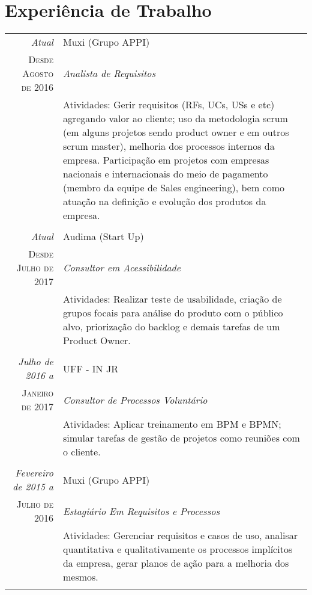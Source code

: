 \documentclass[a4paper,10pt]{article}
\begin{document}
\section{Experiência de Trabalho}
\begin{tabular}{r|p{10cm}}
 \emph{Atual} & Muxi (Grupo APPI) \\
 \textsc{Desde Agosto de 2016}&\emph{Analista de Requisitos}\\
 &\footnotesize{Atividades: Gerir requisitos (RFs, UCs, USs e etc) agregando valor ao cliente; uso da metodologia scrum (em alguns projetos sendo product owner e em outros scrum master), melhoria dos processos internos da empresa. Participação em projetos com empresas nacionais e internacionais do meio de pagamento (membro da equipe de Sales engineering), bem como atuação na definição e evolução dos produtos da empresa.}\\
  
 & \\
 
 \emph{Atual} & Audima (Start Up) \\
 \textsc{Desde Julho de 2017}&\emph{Consultor em Acessibilidade}\\
 &\footnotesize{Atividades: Realizar teste de usabilidade, criação de grupos focais para análise do produto com o público alvo, priorização do backlog e demais tarefas de um Product Owner.}\\
 
 & \\
 
 \emph{Julho de 2016 a} & UFF - IN JR \\
 \textsc{Janeiro de 2017}&\emph{Consultor de Processos Voluntário}\\
 &\footnotesize{Atividades: Aplicar treinamento em BPM e BPMN; simular tarefas de gestão de projetos como reuniões com o cliente.}\\
 
 & \\
 
 \emph{Fevereiro de 2015 a} & Muxi (Grupo APPI) \\
 \textsc{Julho de 2016}&\emph{Estagiário Em Requisitos e Processos}\\
 &\footnotesize{Atividades: Gerenciar requisitos e casos de uso, analisar quantitativa e qualitativamente os processos implícitos da empresa, gerar planos de ação para a melhoria dos mesmos.}\\
 
 & \\
 

\end{tabular}
\end{document}
